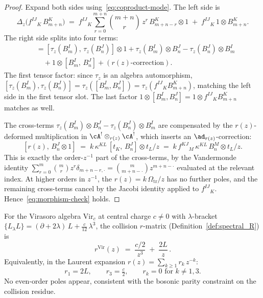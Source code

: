 \begin{proof}
Expand both sides using~\eqref{eq:coproduct-mode}. The left
side is
\[
 \Delta_z\bigl(f^{IJ}{}_K\, B^K_{m+n}\bigr)
 \;=\;
 f^{IJ}{}_K \sum_{r=0}^{m+n} \binom{m{+}n}{r}\,z^r\,
 B^K_{m+n-r} \otimes 1
 \;+\;
 f^{IJ}{}_K\, 1 \otimes B^K_{m+n}.
\]
The right side splits into four terms:
\begin{align*}
[\Delta_z(B^I_m),\, \Delta_z(B^J_n)]
 &= [\tau_z(B^I_m),\, \tau_z(B^J_n)] \otimes 1
 + \tau_z(B^I_m) \otimes B^J_n
 - \tau_z(B^J_n) \otimes B^I_m \\
 &\quad + 1 \otimes [B^I_m,\, B^J_n]
 + (\text{$r(z)$-correction}).
\end{align*}
The first tensor factor: since $\tau_z$ is an algebra
automorphism,
$[\tau_z(B^I_m), \tau_z(B^J_n)]
= \tau_z([B^I_m, B^J_n])
= \tau_z(f^{IJ}{}_K B^K_{m+n})$,
matching the left side in the first tensor slot.
The last factor $1 \otimes [B^I_m, B^J_n]
= 1 \otimes f^{IJ}{}_K B^K_{m+n}$
matches as well.

The cross-terms
$\tau_z(B^I_m) \otimes B^J_n - \tau_z(B^J_n) \otimes B^I_m$
are compensated by the $r(z)$-deformed multiplication in
$\cA^! \otimes_{r(z)} \cA^!$, which inserts an
$\ad_{r(z)}$-correction:
\[
 [r(z),\, B^J_n \otimes 1]
 \;=\; k\,\kappa^{KL}\,
 [t_K,\, B^J_n] \otimes t_L / z
 \;=\; k\, f^{KJ}{}_M\, \kappa^{KL}\,
 B^M_n \otimes t_L / z.
\]
This is exactly the order-$z^{-1}$ part of the cross-terms,
by the Vandermonde identity
$\sum_{r=0}^m \binom{m}{r} z^r \delta_{m+n-r,\cdot}
= \binom{m}{m+n-\cdot} z^{m+n-\cdot}$
evaluated at the relevant index. At higher orders in $z^{-1}$,
the $r(z) = k\,\Omega_{\mathrm{tr}}/z$ has no further poles, and the
remaining cross-terms cancel by the Jacobi identity applied to
$f^{IJ}{}_K$. Hence~\eqref{eq:morphism-check} holds.
\end{proof}

\begin{proposition}
\label{prop:virasoro-r-mode}
For the Virasoro algebra $\mathrm{Vir}_c$ at central charge
$c \neq 0$ with $\lambda$-bracket
$\{L {}_\lambda L\} = (\partial + 2\lambda)\,L +
\tfrac{c}{12}\,\lambda^3$,
the collision $r$-matrix
\textup{(}Definition~\textup{\ref{def:spectral_R}}\textup{)}
is
\begin{equation}\label{eq:virasoro-r-collision}
 r^{\mathrm{Vir}}(z) \;=\; \frac{c/2}{z^3}
 \;+\; \frac{2L}{z}\,.
\end{equation}
Equivalently, in the Laurent expansion
$r(z) = \sum_{k \ge 1} r_k\, z^{-k}$:
\begin{equation}\label{eq:virasoro-r-laurent}
 r_1 = 2L, \qquad r_3 = \tfrac{c}{2},
 \qquad r_k = 0 \text{ for } k \neq 1,3.
\end{equation}
No even-order poles appear, consistent with the bosonic
parity constraint on the collision residue.
\end{proposition}

